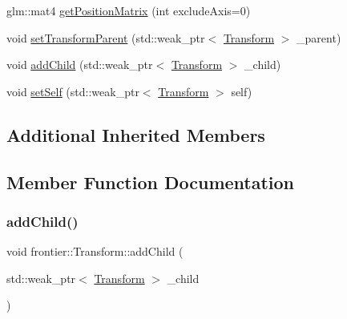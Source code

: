 \begin{DoxyCompactItemize}
\item 
glm\+::mat4 \hyperlink{classfrontier_1_1_transform_aad2ce67da24359ea8840db6af730b41a}{get\+Position\+Matrix} (int exclude\+Axis=0)
\item 
void \hyperlink{classfrontier_1_1_transform_ad4e673db3400d3c505ceb9fc1ececfbb}{set\+Transform\+Parent} (std\+::weak\+\_\+ptr$<$ \hyperlink{classfrontier_1_1_transform}{Transform} $>$ \+\_\+parent)
\item 
void \hyperlink{classfrontier_1_1_transform_a840205cbc6abd6328bf9c6b08d1f45a3}{add\+Child} (std\+::weak\+\_\+ptr$<$ \hyperlink{classfrontier_1_1_transform}{Transform} $>$ \+\_\+child)
\item 
void \hyperlink{classfrontier_1_1_transform_aab8d4bc98d9de708ba1ab9cd8e0d7f64}{set\+Self} (std\+::weak\+\_\+ptr$<$ \hyperlink{classfrontier_1_1_transform}{Transform} $>$ self)
\end{DoxyCompactItemize}
\subsection*{Additional Inherited Members}


\subsection{Member Function Documentation}
\mbox{\label{classfrontier_1_1_transform_a840205cbc6abd6328bf9c6b08d1f45a3}} 
\subsubsection{\texorpdfstring{add\+Child()}{addChild()}}
{\footnotesize\ttfamily void frontier\+::\+Transform\+::add\+Child (\begin{DoxyParamCaption}\item[{std\+::weak\+\_\+ptr$<$ \hyperlink{classfrontier_1_1_transform}{Transform} $>$}]{\+\_\+child }\end{DoxyParamCaption})}

\mbox{\label{classfrontier_1_1_transform_ac6eb361f0481c70157753d7965b92f4c}} 

